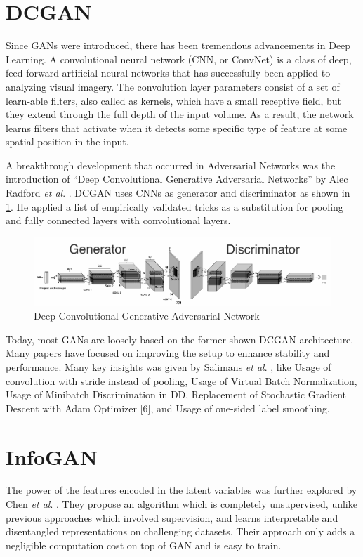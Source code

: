 \section{DCGAN} %
\label{sec:dcgan}
Since GANs were introduced, there has been tremendous advancements in Deep Learning. A convolutional neural network (CNN, or ConvNet) \cite{imagenet} is a class of deep, feed-forward artificial neural networks that has successfully been applied to analyzing visual imagery. The convolution layer parameters consist of a set of learn-able filters, also called as kernels, which have a small receptive field, but they extend through the full depth of the input volume. As a result, the network learns filters that activate when it detects some specific type of feature at some spatial position in the input.
\par\bigskip
A breakthrough development that occurred in Adversarial Networks was the introduction of “Deep Convolutional Generative Adversarial Networks” by Alec Radford \textit{et al}. \cite{dcgan}. DCGAN uses CNNs as generator and discriminator as shown in \ref{fig:dcgan}. He applied a list of empirically validated tricks as a substitution for pooling and fully connected layers with convolutional layers.
\par\bigskip
\begin{figure}[H]
\centering\includegraphics[width=1\textwidth]{images/dcgan.png}
\caption{Deep Convolutional Generative Adversarial Network}
\label{fig:dcgan}
\end{figure}
Today, most GANs are loosely based on the former shown DCGAN \cite{dcgan} architecture. Many papers have focused on improving the setup to enhance stability and performance. Many key insights was given by Salimans \textit{et al}. \cite{improvedgan}, like Usage of convolution with stride instead of pooling, Usage of Virtual Batch Normalization, Usage of Minibatch Discrimination in DD, Replacement of Stochastic Gradient Descent with Adam Optimizer [6], and Usage of one-sided label smoothing.
\par\bigskip
\section{InfoGAN} %
\label{sec:infogan}
The power of the features encoded in the latent variables was further explored by Chen \textit{et al}. \cite{infogan}. They propose an algorithm which is completely unsupervised, unlike previous approaches which involved supervision, and learns interpretable and disentangled representations on challenging datasets. Their approach only adds a negligible computation cost on top of GAN and is easy to train.
\par\bigskip

